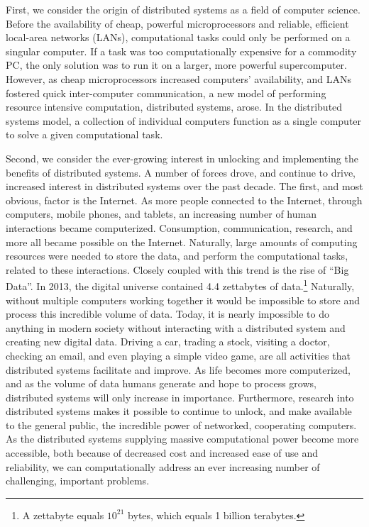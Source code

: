 \documentclass[twoside]{report}
\begin{document}
First, we consider the origin of distributed systems as a field of computer
science. Before the availability of cheap, powerful microprocessors and reliable,
efficient local-area networks (LANs), computational tasks could only be
performed on a singular computer.\cite[pg.
1]{distributed-systems-principles-and-paradigms} If a task was too
computationally expensive for a commodity PC, the only solution was to run
it on a larger, more powerful supercomputer. However, as cheap microprocessors
increased computers' availability, and LANs fostered quick inter-computer
communication, a new
model of performing resource intensive computation, distributed
systems, arose. In the distributed systems model, a collection of individual
computers function as a single computer to solve a given computational task.\cite[pg.
2]{distributed-systems-principles-and-paradigms}

Second, we consider the ever-growing interest in unlocking and implementing the
benefits of distributed systems. A number of forces drove, and continue to drive,
increased interest in distributed systems over
the past decade. The first, and most obvious, factor is the Internet.
As more people connected to the Internet, through computers,
mobile phones, and tablets, an increasing number of human interactions became
computerized. Consumption, communication, research, and more all
became possible on the Internet. Naturally, large amounts of computing resources
were needed to store the data, and perform the computational tasks, related to these
interactions. Closely coupled with this trend is the rise of ``Big Data''.
In 2013, the digital universe contained 4.4 zettabytes of data.\footnote{A
  zettabyte equals $10^{21}$ bytes, which equals 1 billion
terabytes.}\cite{the-digital-universe-of-opportunities} Naturally, without
multiple computers working together it would be impossible to store and process
this incredible volume of data. Today, it is nearly impossible to do
anything in modern society without interacting with a distributed system and
creating new digital data. Driving a car, trading a stock, visiting a doctor,
checking an email, and even playing a simple video game, are all activities that
distributed systems facilitate and improve.\cite[pg.
4]{distributed-systems-concepts-and-design} As life becomes more
computerized, and as the volume of data humans generate and hope to process
grows, distributed systems will only increase in importance.
Furthermore, research into distributed systems makes it possible to
continue to unlock, and make available to the general public,
the incredible power of networked, cooperating computers. As the distributed systems
supplying massive computational power become more
accessible, both because of decreased cost and increased ease of use and
reliability, we can
computationally address an ever increasing number of challenging, important problems.
\end{document}
